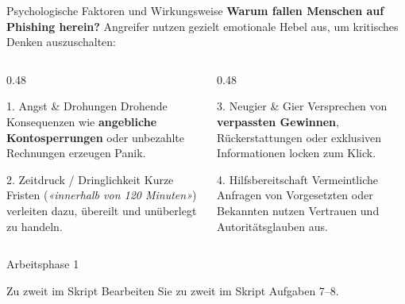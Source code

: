 \documentclass[10pt, aspectratio=169]{beamer}
\begin{document}
\begin{frame}{Psychologische Faktoren und Wirkungsweise}
  \pause
  \textbf{Warum fallen Menschen auf Phishing herein?} Angreifer nutzen gezielt emotionale Hebel aus, um kritisches Denken auszuschalten:
  \vspace{0.8em}

  \begin{columns}[T]
    \pause
    \begin{column}{0.48\textwidth}
      \begin{alertblock}{1. Angst \& Drohungen}
        Drohende Konsequenzen wie \textbf{angebliche Kontosperrungen} oder unbezahlte Rechnungen erzeugen Panik.
      \end{alertblock}
      \vspace{0.5em}
      \pause
      \begin{alertblock}{2. Zeitdruck / Dringlichkeit}
        Kurze Fristen (\textit{«innerhalb von 120 Minuten»}) verleiten dazu, übereilt und unüberlegt zu handeln.
      \end{alertblock}
    \end{column}

    \pause
    \begin{column}{0.48\textwidth}
      \begin{block}{3. Neugier \& Gier}
        Versprechen von \textbf{verpassten Gewinnen}, Rückerstattungen oder exklusiven Informationen locken zum Klick.
      \end{block}
      \vspace{0.5em}
      \pause
      \begin{block}{4. Hilfsbereitschaft}
        Vermeintliche Anfragen von Vorgesetzten oder Bekannten nutzen Vertrauen und Autoritätsglauben aus.
      \end{block}
    \end{column}
  \end{columns}
\end{frame}

\begin{frame}{Arbeitsphase 1}
  \pause
  \begin{block}{Zu zweit im Skript}
    Bearbeiten Sie zu zweit im Skript Aufgaben 7--8.
  \end{block}
\end{frame}
\end{document}

